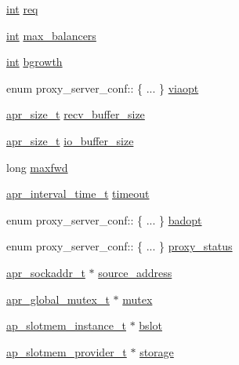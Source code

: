 \begin{DoxyCompactItemize}
\hyperlink{pcre_8txt_a42dfa4ff673c82d8efe7144098fbc198}{int} \hyperlink{structproxy__server__conf_a24ac6685fb54da0cc7dfcf378617fb48}{req}
\item 
\hyperlink{pcre_8txt_a42dfa4ff673c82d8efe7144098fbc198}{int} \hyperlink{structproxy__server__conf_ae48d5c603cf72a0bcd4d276a581751a9}{max\+\_\+balancers}
\item 
\hyperlink{pcre_8txt_a42dfa4ff673c82d8efe7144098fbc198}{int} \hyperlink{structproxy__server__conf_ac6b6680ea2189a993cb8e3ac51c08a95}{bgrowth}
\item 
enum proxy\+\_\+server\+\_\+conf\+:: \{ ... \}  \hyperlink{structproxy__server__conf_afc8fee1717b19fca5aa8334e2d30f6e1}{viaopt}
\item 
\hyperlink{group__apr__platform_gaaa72b2253f6f3032cefea5712a27540e}{apr\+\_\+size\+\_\+t} \hyperlink{structproxy__server__conf_a1a12831ff55cb8d1386ce46dec2f3043}{recv\+\_\+buffer\+\_\+size}
\item 
\hyperlink{group__apr__platform_gaaa72b2253f6f3032cefea5712a27540e}{apr\+\_\+size\+\_\+t} \hyperlink{structproxy__server__conf_ab27570ca30d501d9b10a7a424bee8799}{io\+\_\+buffer\+\_\+size}
\item 
long \hyperlink{structproxy__server__conf_a7acaf2f24a0d406267765dc03ce5c08a}{maxfwd}
\item 
\hyperlink{group__apr__time_gaae2129185a395cc393f76fabf4f43e47}{apr\+\_\+interval\+\_\+time\+\_\+t} \hyperlink{structproxy__server__conf_a9c5bbb24175d3993f75556477ef7cd2e}{timeout}
\item 
enum proxy\+\_\+server\+\_\+conf\+:: \{ ... \}  \hyperlink{structproxy__server__conf_a13c2a8bc7629dd5c24453ae87553f042}{badopt}
\item 
enum proxy\+\_\+server\+\_\+conf\+:: \{ ... \}  \hyperlink{structproxy__server__conf_a9f7dbf7d09b9fe19a59e0f13961b7483}{proxy\+\_\+status}
\item 
\hyperlink{structapr__sockaddr__t}{apr\+\_\+sockaddr\+\_\+t} $\ast$ \hyperlink{structproxy__server__conf_a63ffef4004c1f780a378788a626c31b2}{source\+\_\+address}
\item 
\hyperlink{structapr__global__mutex__t}{apr\+\_\+global\+\_\+mutex\+\_\+t} $\ast$ \hyperlink{structproxy__server__conf_aab4e8210cdcf352ef4813f7c6165dc4a}{mutex}
\item 
\hyperlink{structap__slotmem__instance__t}{ap\+\_\+slotmem\+\_\+instance\+\_\+t} $\ast$ \hyperlink{structproxy__server__conf_adeedc66ddf5d04d8d310473afaef900f}{bslot}
\item 
\hyperlink{structap__slotmem__provider__t}{ap\+\_\+slotmem\+\_\+provider\+\_\+t} $\ast$ \hyperlink{structproxy__server__conf_a665167162238a5df57534ce832667d65}{storage}

\end{DoxyCompactItemize}
